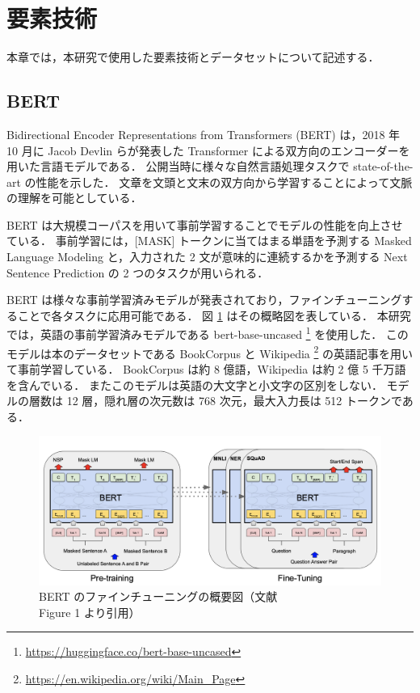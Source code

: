 \newpage
\changeindent{0cm}
\section{要素技術}
\changeindent{2cm}


本章では，本研究で使用した要素技術とデータセットについて記述する．
\subsection{BERT}

Bidirectional Encoder Representations from Transformers (BERT) \cite{devlin-etal-2019-bert} は，2018 年 10 月に Jacob Devlin らが発表した Transformer \cite{NIPS2017_3f5ee243} による双方向のエンコーダーを用いた言語モデルである．
公開当時に様々な自然言語処理タスクで state-of-the-art の性能を示した．
文章を文頭と文末の双方向から学習することによって文脈の理解を可能としている．
\par 
BERT は大規模コーパスを用いて事前学習することでモデルの性能を向上させている．
事前学習には，[MASK] トークンに当てはまる単語を予測する Masked Language Modeling と，入力された 2 文が意味的に連続するかを予測する Next Sentence Prediction の 2 つのタスクが用いられる．
\par
BERT は様々な事前学習済みモデルが発表されており，ファインチューニングすることで各タスクに応用可能である．
図 \ref{fig:31_bert_model} はその概略図を表している．
本研究では，英語の事前学習済みモデルである bert-base-uncased \footnote{\url{https://huggingface.co/bert-base-uncased}} を使用した．
このモデルは本のデータセットである BookCorpus \cite{bookcorpus} と Wikipedia \footnote{\url{https://en.wikipedia.org/wiki/Main_Page}} の英語記事を用いて事前学習している．
BookCorpus は約 8 億語，Wikipedia は約 2 億 5 千万語を含んでいる．
またこのモデルは英語の大文字と小文字の区別をしない．
モデルの層数は 12 層，隠れ層の次元数は 768 次元，最大入力長は 512 トークンである．


\begin{figure}[b]
 	\begin{center}
		\includegraphics[width=\linewidth]{./figure/31_BERT_figure1.png}
		\caption{BERT のファインチューニングの概要図（文献 \cite{devlin-etal-2019-bert} Figure 1 より引用）}
		\label{fig:31_bert_model}
	\end{center}
\end{figure}

